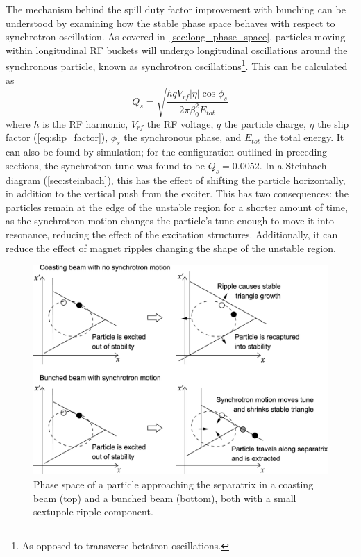\documentclass[a4paper,twoside,11pt]{report}
\begin{document}
The mechanism behind the spill duty factor improvement with bunching can be understood by examining how the stable phase space behaves with respect to synchrotron oscillation. As covered in~\autoref{sec:long_phase_space}, particles moving within longitudinal RF buckets will undergo longitudinal oscillations around the synchronous particle, known as synchrotron oscillations\footnote{As opposed to transverse betatron oscillations.}. This can be calculated as
\begin{equation}
  Q_s = \sqrt{\frac{hqV_{rf}|\eta|\cos\phi_s}{2\pi\beta_0^2E_{tot}}}
\end{equation} where $h$ is the RF harmonic, $V_{rf}$ the RF voltage, $q$ the particle charge, $\eta$ the slip factor (\autoref{eq:slip_factor}), $\phi_s$ the synchronous phase, and $E_{tot}$ the total energy. It can also be found by simulation; for the configuration outlined in preceding sections, the synchrotron tune was found to be $Q_s = 0.0052$. 
In a Steinbach diagram (\autoref{sec:steinbach}), this has the effect of shifting the particle horizontally, in addition to the vertical push from the exciter. This has two consequences: the particles remain at the edge of the unstable region for a shorter amount of time, as the synchrotron motion changes the particle's tune enough to move it into resonance, reducing the effect of the excitation structures. Additionally, it can reduce the effect of magnet ripples changing the shape of the unstable region.

\begin{figure}[h]
  \centering
  \includegraphics*[width=0.66\linewidth]{synch-phase-space.png}
  \caption[Phase-space diagram of bunched beam effect on sextupole ripple]{Phase space of a particle approaching the separatrix in a coasting beam (top) and a bunched beam (bottom), both with a small sextupole ripple component.}
  \label{fig:synch-phase-space}
\end{figure}
\end{document}
